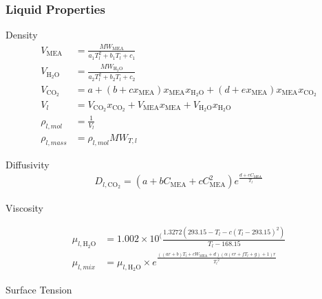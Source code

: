 \documentclass[12pt, letterpaper]{article}
\begin{document}
                \subsubsection{Liquid Properties}
        
                    Density
                    \begin{align}
                        V_{\mathrm{MEA}} &=  \frac{MW_{\mathrm{MEA}}}{a_1 T_l^2 + b_1 T_l + c_1} \\
                        V_{\mathrm{H_{2}O}} &=  \frac{MW_{\mathrm{H_{2}O}}}{a_2 T_l^2 + b_2 T_l + c_2} \\
                        V_{\mathrm{CO}_2} &=  a + (b + c x_{\mathrm{MEA}}) x_{\mathrm{MEA}} x_{\mathrm{H_{2}O}} + (d + e x_{\mathrm{MEA}}) x_{\mathrm{MEA}} x_{\mathrm{CO}_2} \\
                        V_l &= V_{\mathrm{CO}_2}x_{\mathrm{CO}_2} + V_{\mathrm{MEA}}x_{\mathrm{MEA}} + V_{\mathrm{H_{2}O}}x_{\mathrm{H_{2}O}} \\
                        \rho _{l,mol} &= \frac{1}{V_l} \\
                        \rho _{l,mass} &= \rho _{l,mol}MW_{T,l}
                    \end{align}
        
                    Diffusivity
                    \begin{align}
                        D_{l, \mathrm{CO}_2} = (a + b C_{\mathrm{MEA}} + c C_{\mathrm{MEA}}^2) e^{\frac{d + e C_{\mathrm{MEA}}}{T_l}}
                    \end{align}
        
                    Viscosity
                    
                    \begin{align}
                        \mu _{l,\mathrm{H_{2}O}} &= 1.002 \times 10^(\frac{1.3272(293.15 - T_l - c(T_l - 293.15)^2)}{T_l - 168.15} \\
                        \mu _{l,mix} &= \mu _{l,\mathrm{H_{2}O}} \times e^{\frac{\left(\left(a r+b\right) T_l+c W_{\mathrm{MEA}}+d\right) \left(\alpha \left(e r+f T_l+g\right)+1\right) r}{{T_l}^2}}
                    \end{align}
        
                    Surface Tension
                    
\end{document}

